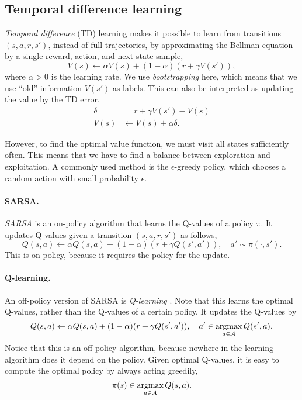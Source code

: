 \subsection{Temporal difference learning}

\textit{Temporal difference} (TD) learning makes it possible to learn from transitions $(s,a,r,s')$,
instead of full trajectories, by approximating the Bellman equation by a single reward, action,
and next-state sample, \[
    V(s) \gets \alpha V(s) + (1-\alpha) (r + \gamma V(s')),
\]
where $\alpha > 0$ is the learning rate. We use \textit{bootstrapping} here, which means that we
use ``old'' information $V(s')$ as labels. This can also be interpreted as updating the value by
the TD error,
\begin{align*}
    \delta & = r + \gamma V(s') - V(s)   \\
    V(s)   & \gets V(s) + \alpha \delta.
\end{align*}

However, to find the optimal value function, we must visit all states sufficiently often. This
means that we have to find a balance between exploration and exploitation. A commonly used method
is the $\epsilon$-greedy policy, which chooses a random action with small probability $\epsilon$.

\paragraph{SARSA.} \textit{SARSA} \citep{rummery1994line} is an on-policy algorithm that learns the
Q-values of a policy $\pi$. It updates Q-values given a transition $(s, a, r, s')$ as follows, \[
    Q(s,a) \gets \alpha Q(s,a) + (1-\alpha) (r + \gamma Q(s', a')), \quad a' \sim \pi(\cdot, s').
\]
This is on-policy, because it requires the policy for the update.

\paragraph{Q-learning.} An off-policy version of SARSA is \textit{Q-learning} \citep{watkins1992q}. Note that this learns
the optimal Q-values, rather than the Q-values of a certain policy. It updates the Q-values by \[
    Q(s,a) \gets \alpha Q(s,a) + (1-\alpha) (r + \gamma Q(s', a')), \quad a' \in \operatorname*{argmax}_{a \in \mathcal{A}} Q(s', a).
\]
Notice that this is an off-policy algorithm, because nowhere in the learning algorithm does it
depend on the policy. Given optimal Q-values, it is easy to compute the optimal policy by always
acting greedily, \[
    \pi(s) \in \operatorname*{argmax}_{a \in \mathcal{A}} Q(s, a).
\]

